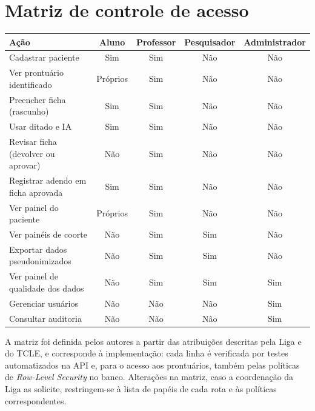 \chapter{Matriz de controle de acesso}
\label{apendice:rbac}

\begin{quadro}[htbp]
	\caption{Permissões por papel}
	\label{qua:rbac}
	\footnotesize
	\centering
	\begin{tabular}{|l|c|c|c|c|}
		\hline
		\textbf{Ação} & \textbf{Aluno} & \textbf{Professor} & \textbf{Pesquisador} & \textbf{Administrador} \\ \hline
		Cadastrar paciente & Sim & Sim & Não & Não \\ \hline
		Ver prontuário identificado & Próprios & Sim & Não & Não \\ \hline
		Preencher ficha (rascunho) & Sim & Sim & Não & Não \\ \hline
		Usar ditado e IA & Sim & Sim & Não & Não \\ \hline
		Revisar ficha (devolver ou aprovar) & Não & Sim & Não & Não \\ \hline
		Registrar adendo em ficha aprovada & Sim & Sim & Não & Não \\ \hline
		Ver painel do paciente & Próprios & Sim & Não & Não \\ \hline
		Ver painéis de coorte & Não & Sim & Sim & Não \\ \hline
		Exportar dados pseudonimizados & Não & Sim & Sim & Não \\ \hline
		Ver painel de qualidade dos dados & Não & Sim & Sim & Sim \\ \hline
		Gerenciar usuários & Não & Não & Não & Sim \\ \hline
		Consultar auditoria & Não & Não & Não & Sim \\ \hline
	\end{tabular}
\end{quadro}

A matriz foi definida pelos autores a partir das atribuições descritas pela Liga e do TCLE, e corresponde à implementação: cada linha é verificada por testes automatizados na API e, para o acesso aos prontuários, também pelas políticas de \textit{Row-Level Security} no banco. Alterações na matriz, caso a coordenação da Liga as solicite, restringem-se à lista de papéis de cada rota e às políticas correspondentes.

